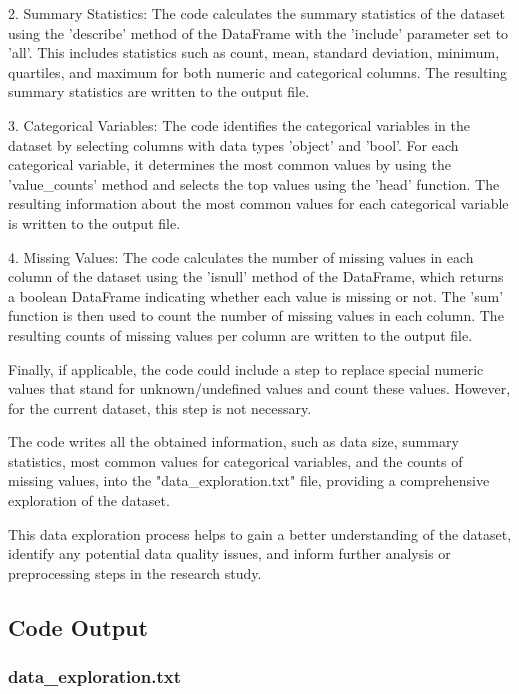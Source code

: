 \documentclass[11pt]{article}
\begin{document}
2. Summary Statistics:
   The code calculates the summary statistics of the dataset using the 'describe' method of the DataFrame with the 'include' parameter set to 'all'. This includes statistics such as count, mean, standard deviation, minimum, quartiles, and maximum for both numeric and categorical columns. The resulting summary statistics are written to the output file.

3. Categorical Variables:
   The code identifies the categorical variables in the dataset by selecting columns with data types 'object' and 'bool'. For each categorical variable, it determines the most common values by using the 'value\_counts' method and selects the top values using the 'head' function. The resulting information about the most common values for each categorical variable is written to the output file.

4. Missing Values:
   The code calculates the number of missing values in each column of the dataset using the 'isnull' method of the DataFrame, which returns a boolean DataFrame indicating whether each value is missing or not. The 'sum' function is then used to count the number of missing values in each column. The resulting counts of missing values per column are written to the output file.

Finally, if applicable, the code could include a step to replace special numeric values that stand for unknown/undefined values and count these values. However, for the current dataset, this step is not necessary.

The code writes all the obtained information, such as data size, summary statistics, most common values for categorical variables, and the counts of missing values, into the "data\_exploration.txt" file, providing a comprehensive exploration of the dataset.

This data exploration process helps to gain a better understanding of the dataset, identify any potential data quality issues, and inform further analysis or preprocessing steps in the research study.

\subsection{Code Output}

\subsubsection*{data\_exploration.txt}
\end{document}
